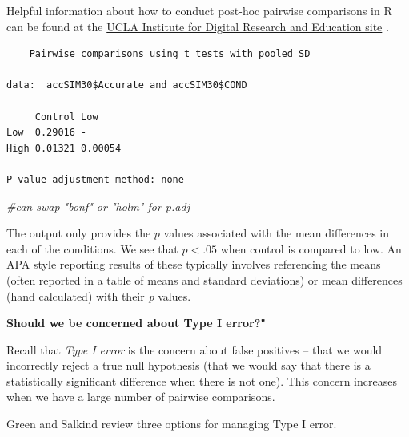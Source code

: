 \documentclass[
  english,
]{book}
\newenvironment{Shaded}{\begin{snugshade}}{\end{snugshade}}
\newcommand{\AttributeTok}[1]{\textcolor[rgb]{0.77,0.63,0.00}{#1}}
\newcommand{\CommentTok}[1]{\textcolor[rgb]{0.56,0.35,0.01}{\textit{#1}}}
\newcommand{\FunctionTok}[1]{\textcolor[rgb]{0.00,0.00,0.00}{#1}}
\newcommand{\NormalTok}[1]{#1}
\newcommand{\SpecialCharTok}[1]{\textcolor[rgb]{0.00,0.00,0.00}{#1}}
\newcommand{\StringTok}[1]{\textcolor[rgb]{0.31,0.60,0.02}{#1}}
\begin{document}
Helpful information about how to conduct post-hoc pairwise comparisons in R can be found at the \href{https://stats.idre.ucla.edu/r/faq/how-can-i-do-post-hoc-pairwise-comparisons-in-r/}{UCLA Institute for Digital Research and Education site} \citep{noauthor_how_nodate}.

\begin{Shaded}
\end{Shaded}

\begin{verbatim}
    Pairwise comparisons using t tests with pooled SD 

data:  accSIM30$Accurate and accSIM30$COND 

     Control Low    
Low  0.29016 -      
High 0.01321 0.00054

P value adjustment method: none 
\end{verbatim}

\begin{Shaded}
\begin{Highlighting}[]
\CommentTok{\#can swap "bonf" or "holm" for p.adj}
\end{Highlighting}
\end{Shaded}

The output only provides the \(p\) values associated with the mean differences in each of the conditions. We see that \(p < .05\) when control is compared to low. An APA style reporting results of these typically involves referencing the means (often reported in a table of means and standard deviations) or mean differences (hand calculated) with their \emph{p} values.

\textbf{Should we be concerned about Type I error?"}

Recall that \emph{Type I error} is the concern about false positives -- that we would incorrectly reject a true null hypothesis (that we would say that there is a statistically significant difference when there is not one). This concern increases when we have a large number of pairwise comparisons.

Green and Salkind \citeyearpar{green_using_2014} review three options for managing Type I error.
\end{document}
